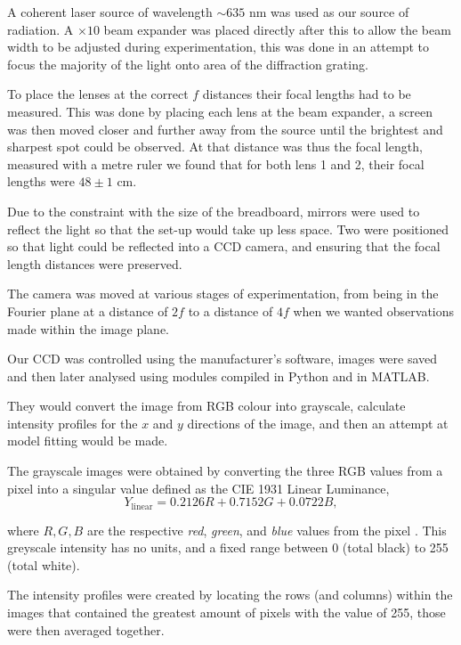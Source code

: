 \documentclass[twocolumn]{revtex4}
\begin{document}
A coherent laser source of wavelength $\sim635$ nm was used as our source of radiation. A $\times10$ beam expander was placed directly after this to allow the beam width to be adjusted during experimentation, this was done in an attempt to focus the majority of the light onto area of the diffraction grating.

To place the lenses at the correct $f$ distances their focal lengths had to be measured. This was done by placing each lens at the beam expander, a screen was then moved closer and further away from the source until the brightest and sharpest spot could be observed. At that distance was thus the focal length, measured with a metre ruler we found that for both lens 1 and 2, their focal lengths were $48\pm1$ cm.

Due to the constraint with the size of the breadboard, mirrors were used to reflect the light so that the set-up would take up less space. Two were positioned so that light could be reflected into a CCD camera, and ensuring that the focal length distances were preserved.

The camera was moved at various stages of experimentation, from being in the Fourier plane at a distance of $2f$ to a distance of $4f$ when we wanted observations made within the image plane.

Our CCD was controlled using the manufacturer's software, images were saved and then later analysed using modules compiled in Python and in MATLAB. 

They would convert the image from RGB colour into grayscale, calculate intensity profiles for the $x$ and $y$ directions of the image, and then an attempt at model fitting would be made.

The grayscale images were obtained by converting the three RGB values from a pixel into a singular value defined as the CIE 1931 Linear Luminance,
\begin{equation}
Y_{\text{linear}}=0.2126R+0.7152G+0.0722B,
\end{equation}

where $R,G,B$ are the respective \textit{red}, \textit{green}, and \textit{blue} values from the pixel \cite{rgbtogray}. This greyscale intensity has no units, and a fixed range between 0 (total black) to 255 (total white).

The intensity profiles were created by locating the rows (and columns) within the images that contained the greatest amount of pixels with the value of 255, those were then averaged together. 
\end{document}
